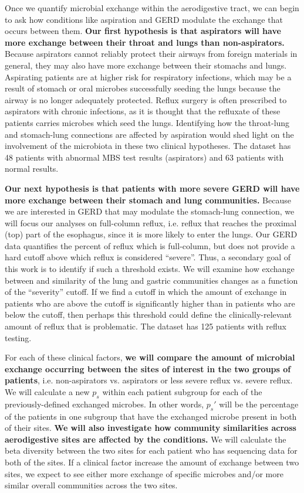 \documentclass[12pt]{article}
\begin{document}
Once we quantify microbial exchange within the aerodigestive tract, we 
can begin to ask how conditions like aspiration and GERD modulate the exchange 
that occurs between them. \textbf{Our first hypothesis is that aspirators will have more exchange between their throat 
and lungs than non-aspirators.} Because aspirators cannot reliably protect
their airways from foreign materials in general, they may also have more exchange between their stomachs and lungs.
Aspirating patients are at higher risk for respiratory infections, which
may be a result of stomach or oral microbes successfully seeding the lungs
because the airway is no longer adequately protected.
Reflux surgery is often prescribed to aspirators with chronic infections,
as it is thought that the refluxate of these patients carries microbes which seed the lungs. 
Identifying how the throat-lung and stomach-lung connections are affected by aspiration 
would shed light on the involvement of the microbiota in these two clinical hypotheses.
The dataset has 48 patients with abnormal MBS test results (aspirators) and 63 patients with normal results.

\textbf{Our next hypothesis is that patients with more severe GERD will have 
more exchange between their stomach and lung communities.} Because we are 
interested in GERD that may modulate the stomach-lung connection, 
we will focus our analyses on full-column reflux, i.e. reflux that reaches the 
proximal (top) part of the esophagus, since it is more likely to enter the lungs.
Our GERD data quantifies the
percent of reflux which is full-column, but does not provide a hard
cutoff above which reflux is considered ``severe''. Thus, a secondary goal
of this work is to identify if such a threshold exists. We will examine
how exchange between and similarity of the lung and gastric communities
changes as a function of the ``severity'' cutoff. If we find a cutoff
in which the amount of exchange in patients who are above the cutoff is 
significantly higher than in patients who are below the cutoff, then perhaps
this threshold could define the clinically-relevant amount of reflux that is
problematic. The dataset has 125 patients with reflux testing.

For each of these clinical factors, \textbf{we will compare the amount of microbial
exchange occurring between the sites of interest in the two groups of patients},
i.e. non-aspirators vs. aspirators or less severe reflux vs. severe reflux. 
We will calculate a new $p_s$ within each patient 
subgroup for each of the previously-defined exchanged microbes.
In other words, $p_s'$ will be the percentage of the patients in one subgroup
that have the exchanged microbe present in both of their sites.
\textbf{We will also investigate how community similarities across aerodigestive
sites are affected by the conditions.} We will calculate the beta diversity
between the two sites for each patient who has sequencing data for both of
the sites. If a clinical factor increase the amount of exchange between
two sites, we expect to see either more exchange of specific microbes 
and/or more similar overall communities across the two sites.
\end{document}
